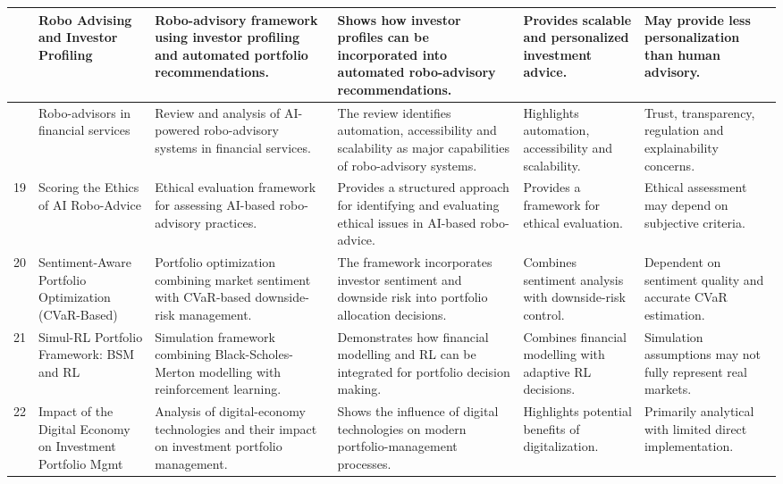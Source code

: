 {{\begin{longtable}{|>{\centering\arraybackslash}p{}|p{}|p{}|p{}|p{}|p{}|}
17 & Robo Advising and Investor Profiling & Robo-advisory framework using investor profiling and automated portfolio recommendations. & Shows how investor profiles can be incorporated into automated robo-advisory recommendations. & Provides scalable and personalized investment advice. & May provide less personalization than human advisory. \\ \hline

18 & Robo-advisors in financial services & Review and analysis of AI-powered robo-advisory systems in financial services. & The review identifies automation, accessibility and scalability as major capabilities of robo-advisory systems. & Highlights automation, accessibility and scalability. & Trust, transparency, regulation and explainability concerns. \\ \hline

19 & Scoring the Ethics of AI Robo-Advice & Ethical evaluation framework for assessing AI-based robo-advisory practices. & Provides a structured approach for identifying and evaluating ethical issues in AI-based robo-advice. & Provides a framework for ethical evaluation. & Ethical assessment may depend on subjective criteria. \\ \hline

20 & Sentiment-Aware Portfolio Optimization (CVaR-Based) & Portfolio optimization combining market sentiment with CVaR-based downside-risk management. & The framework incorporates investor sentiment and downside risk into portfolio allocation decisions. & Combines sentiment analysis with downside-risk control. & Dependent on sentiment quality and accurate CVaR estimation. \\ \hline

21 & Simul-RL Portfolio Framework: BSM and RL & Simulation framework combining Black-Scholes-Merton modelling with reinforcement learning. & Demonstrates how financial modelling and RL can be integrated for portfolio decision making. & Combines financial modelling with adaptive RL decisions. & Simulation assumptions may not fully represent real markets. \\ \hline

22 & Impact of the Digital Economy on Investment Portfolio Mgmt & Analysis of digital-economy technologies and their impact on investment portfolio management. & Shows the influence of digital technologies on modern portfolio-management processes. & Highlights potential benefits of digitalization. & Primarily analytical with limited direct implementation. \\ \hline


\end{longtable}}}
